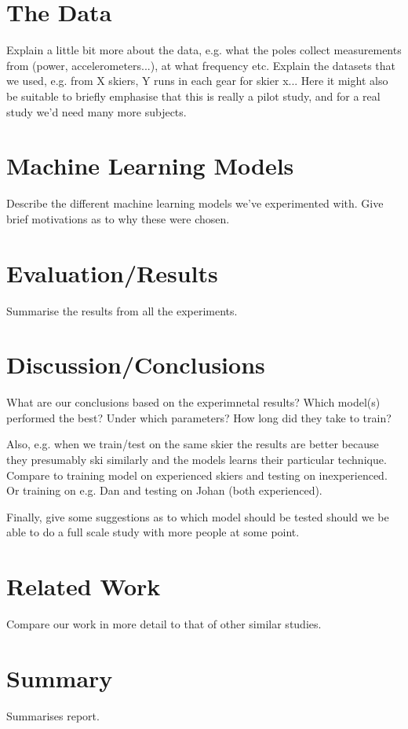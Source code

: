 \documentclass[11pt]{article}
\begin{document}
\section{The Data}
Explain a little bit more about the data, e.g. what the poles collect measurements from (power, accelerometers...), at what frequency etc. 
Explain the datasets that we used, e.g. from X skiers, Y runs in each gear for skier x... 
Here it might also be suitable to briefly emphasise that this is really a pilot study, and for a real study we'd need many more subjects.

\section{Machine Learning Models}
Describe the different machine learning models we've experimented with. Give brief motivations as to why these were chosen.

\section{Evaluation/Results}
Summarise the results from all the experiments.

\section{Discussion/Conclusions}
What are our conclusions based on the experimnetal results? Which model(s) performed the best? Under which parameters? How long did they take to train? 

Also, e.g. when we train/test on the same skier the results are better because they presumably ski similarly and the models learns their particular technique. Compare to training model on experienced skiers and testing on inexperienced. Or training on e.g. Dan and testing on Johan (both experienced). 

Finally, give some suggestions as to which model should be tested should we be able to do a full scale study with more people at some point.

\section{Related Work}
Compare our work in more detail to that of other similar studies.

\section{Summary}
Summarises report.



\end{document}
